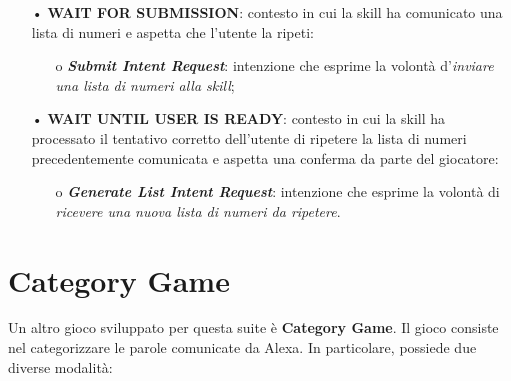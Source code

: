 \begin{itemize}
\begin{itemize}
\begin{itemize}
                  \item[•] \textbf{WAIT FOR SUBMISSION}: contesto in cui la
                        skill ha comunicato una lista di numeri e aspetta che
                        l’utente la ripeti:
                        \begin{itemize}
                          \item[o] \textit{\textbf{Submit Intent Request}}:
                                intenzione che esprime la volontà
                                d'\textit{inviare una lista di numeri alla
                                skill};
                        \end{itemize}
                  \item[•] \textbf{WAIT UNTIL USER IS READY}: contesto in cui
                        la skill ha processato il tentativo corretto
                        dell’utente di ripetere la lista di numeri
                        precedentemente comunicata e aspetta una conferma da
                        parte del giocatore:
                        \begin{itemize}
                          \item[o] \textit{\textbf{Generate List Intent
                                Request}}: intenzione che esprime la volontà di
                                \textit{ricevere una nuova lista di numeri da
                                ripetere}.
                        \end{itemize}
                \end{itemize}
        \end{itemize}
\end{itemize}

\section{Category Game}
\label{sec:Sezione4.2}

Un altro gioco sviluppato per questa suite è \textbf{Category Game}. Il gioco
consiste nel categorizzare le parole comunicate da Alexa. In particolare,
possiede due diverse modalità:

